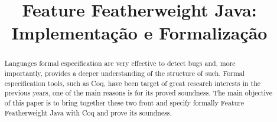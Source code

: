 \documentclass[bacharelado]{unb-cic}
\title{Feature Featherweight Java: Implementação e Formalização}
\theoremstyle{definition}
\theoremstyle{definition}
\begin{document}
  \maketitle
  \pretextual




  \begin{abstract}
  Languages formal especification are very effective to detect bugs and, more
  importantly, provides a deeper understanding of the structure of such. Formal
  especification tools, such as Coq, have been target of great research
  interests in the previous years, one of the main reasons is for its proved
  soundness. The main objective of this paper is to bring together these two
  front and specify formally Feature Featherweight Java with Coq and prove its
  soundness.
  \end{abstract}

  \tableofcontents

  \textual
  
  

  \postextual
  
  
\end{document}
